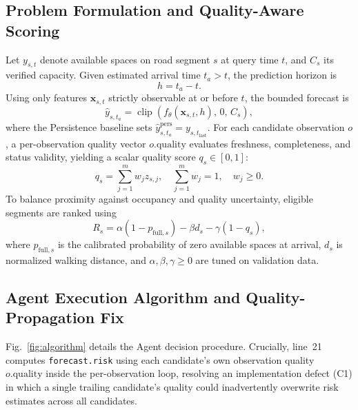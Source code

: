 \documentclass[conference,a4paper]{IEEEtran}
\begin{document}
\subsection{Problem Formulation and Quality-Aware Scoring}
Let $y_{s,t}$ denote available spaces on road segment $s$ at query time $t$, and $C_s$ its verified capacity. Given estimated arrival time $t_a > t$, the prediction horizon is
\begin{equation}
h = t_a - t.
\label{eq:horizon}
\end{equation}
Using only features $\mathbf{x}_{s,t}$ strictly observable at or before $t$, the bounded forecast is
\begin{equation}
\hat{y}_{s,t_a} = \operatorname{clip}\!\left(f_\theta(\mathbf{x}_{s,t}, h),\, 0,\, C_s\right),
\label{eq:forecast}
\end{equation}
where the Persistence baseline sets $\hat{y}^{\mathrm{pers}}_{s,t_a} = y_{s,t_{\mathrm{last}}}$. For each candidate observation $o$, a per-observation quality vector $o.\mathrm{quality}$ evaluates freshness, completeness, and status validity, yielding a scalar quality score $q_s \in [0,1]$:
\begin{equation}
q_s = \sum_{j=1}^{m} w_j z_{s,j}, \quad \sum_{j=1}^{m} w_j = 1, \quad w_j \geq 0.
\end{equation}
To balance proximity against occupancy and quality uncertainty, eligible segments are ranked using
\begin{equation}
R_s = \alpha(1 - p_{\mathrm{full},s}) - \beta d_s - \gamma(1 - q_s),
\label{eq:rank}
\end{equation}
where $p_{\mathrm{full},s}$ is the calibrated probability of zero available spaces at arrival, $d_s$ is normalized walking distance, and $\alpha, \beta, \gamma \geq 0$ are tuned on validation data.

\subsection{Agent Execution Algorithm and Quality-Propagation Fix}
Fig.~\ref{fig:algorithm} details the Agent decision procedure. Crucially, line~21 computes \texttt{forecast.risk} using each candidate's own observation quality $o.\mathrm{quality}$ inside the per-observation loop, resolving an implementation defect (C1) in which a single trailing candidate's quality could inadvertently overwrite risk estimates across all candidates.
\end{document}
